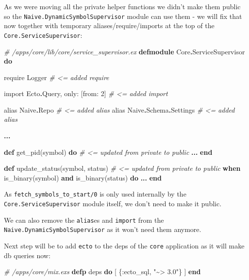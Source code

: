 \documentclass[
]{book}
\newenvironment{Shaded}{\begin{snugshade}}{\end{snugshade}}
\newcommand{\CommentTok}[1]{\textcolor[rgb]{0.56,0.35,0.01}{\textit{#1}}}
\newcommand{\ConstantTok}[1]{\textcolor[rgb]{0.00,0.00,0.00}{#1}}
\newcommand{\DecValTok}[1]{\textcolor[rgb]{0.00,0.00,0.81}{#1}}
\newcommand{\ImportTok}[1]{#1}
\newcommand{\KeywordTok}[1]{\textcolor[rgb]{0.13,0.29,0.53}{\textbf{#1}}}
\newcommand{\NormalTok}[1]{#1}
\newcommand{\OperatorTok}[1]{\textcolor[rgb]{0.81,0.36,0.00}{\textbf{#1}}}
\newcommand{\StringTok}[1]{\textcolor[rgb]{0.31,0.60,0.02}{#1}}
\newcommand{\VariableTok}[1]{\textcolor[rgb]{0.00,0.00,0.00}{#1}}
\begin{document}
As we were moving all the private helper functions we didn't make them public so the \texttt{Naive.DynamicSymbolSupervisor} module can use them - we will fix that now together with temporary aliases/require/imports at the top of the \texttt{Core.ServiceSupervisor}:

\begin{Shaded}
\begin{Highlighting}[]
\CommentTok{\# /apps/core/lib/core/service\_supervisor.ex}
\KeywordTok{defmodule} \ConstantTok{Core}\OperatorTok{.}\ConstantTok{ServiceSupervisor} \KeywordTok{do}

  \ImportTok{require} \ConstantTok{Logger}                     \CommentTok{\# \textless{}= added require}

  \ImportTok{import} \ConstantTok{Ecto}\OperatorTok{.}\ConstantTok{Query}\NormalTok{, }\VariableTok{only:}\NormalTok{ [}\VariableTok{from:} \DecValTok{2}\NormalTok{] }\CommentTok{\# \textless{}= added import}

  \ImportTok{alias} \ConstantTok{Naive}\OperatorTok{.}\ConstantTok{Repo}                   \CommentTok{\# \textless{}= added alias}
  \ImportTok{alias} \ConstantTok{Naive}\OperatorTok{.}\ConstantTok{Schema}\OperatorTok{.}\ConstantTok{Settings}        \CommentTok{\# \textless{}= added alias}

  \OperatorTok{...}

  \KeywordTok{def}\NormalTok{ get\_pid(symbol) }\KeywordTok{do} \CommentTok{\# \textless{}= updated from private to public}
    \OperatorTok{...}
  \KeywordTok{end}

  \KeywordTok{def}\NormalTok{ update\_status(symbol, status) }\CommentTok{\# \textless{}= updated from private to public}
      \KeywordTok{when}\NormalTok{ is\_binary(symbol) }\KeywordTok{and}\NormalTok{ is\_binary(status) }\KeywordTok{do}
    \OperatorTok{...}
  \KeywordTok{end}
\end{Highlighting}
\end{Shaded}

As \texttt{fetch\_symbols\_to\_start/0} is only used internally by the \texttt{Core.ServiceSupervisor} module itself, we don't need to make it public.

We can also remove the \texttt{alias}es and \texttt{import} from the \texttt{Naive.DynamicSymbolSupervisor} as it won't need them anymore.

Next step will be to add \texttt{ecto} to the deps of the \texttt{core} application as it will make db queries now:

\begin{Shaded}
\begin{Highlighting}[]
  \CommentTok{\# /apps/core/mix.exs}
  \KeywordTok{defp}\NormalTok{ deps }\KeywordTok{do}
\NormalTok{    [}
\NormalTok{      \{}\VariableTok{:ecto\_sql}\NormalTok{, }\StringTok{"\textasciitilde{}\textgreater{} 3.0"}\NormalTok{\}}
\NormalTok{    ]}
  \KeywordTok{end}
\end{Highlighting}
\end{Shaded}
\end{document}
